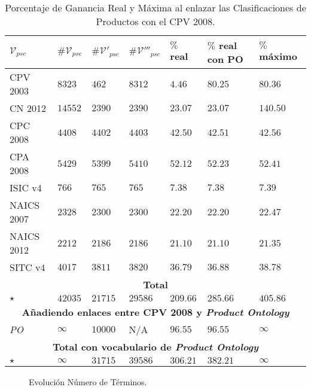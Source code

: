 \documentclass[a4paper,final,11pt,fleqn,twoside]{book}  %
\begin{document}
\begin{table}[!t]
  \centering
  \caption{Porcentaje de Ganancia Real y Máxima al enlazar las Clasificaciones de Productos con el CPV 2008.}\label{ganancia-terminos}   
    \begin{tabular}{|p{1cm}|p{0.9cm}|p{0.9cm}|p{0.9cm}|p{0.9cm}|p{0.9cm}|p{0.75cm}|} 
     \hline
    $\mathcal{V}_{psc}$ & $\#\mathcal{V}_{psc}$  & $\#\mathcal{V'}_{psc}$ &$\#\mathcal{V'''}_{psc}$ &  $\%$ real &  $\%$ real con PO  &  $\%$ máximo   \\\hline
    CPV 2003 	& $8323$  	& $462$		& $8312$ 	& $4.46$ 	& $80.25$	& $80.36$  \\ \hline
    CN 2012  	& $14552$	& $2390$	& $2390$ 	& $23.07$	& $23.07$	& $140.50$  \\ \hline
    CPC 2008 	& $4408$	& $4402$   	& $4403$	& $42.50$	& $42.51$ 	& $42.56$  \\ \hline
    CPA 2008 	& $5429$	& $5399$   	& $5410$	& $52.12$	& $52.23$	& $52.41$  \\ \hline
    ISIC v4  	& $766$		& $765$   	& $765$ 	& $7.38$ 	& $7.38$	& $7.39$    \\ \hline
    NAICS 2007 	& $2328$	& $2300$ 	& $2300$	& $22.20$	& $22.20$	& $22.47$  \\ \hline
    NAICS 2012 	& $2212$	& $2186$ 	& $2186$	& $21.10$	& $21.10$	& $21.35$  \\ \hline
    SITC v4 	& $4017$	& $3811$   	& $3820$	& $36.79$	& $36.88$	& $38.78$  \\ \hline
    \multicolumn{7}{|c|}{\textbf{Total}} \\ \hline
    $\star$ & $42035$ 		& $21715$   	& $29586$	& $209.66$ 	& $285.66$	& $405.86$ \\ \hline
    \hline
    \multicolumn{7}{|c|}{\textbf{Añadiendo enlaces entre CPV 2008 y \textit{Product Ontology}}} \\ \hline
    \textit{PO}& $\infty$	& $10000$   	& N/A	& $96.55$	& $96.55$ 	& $\infty$  \\ \hline
    \multicolumn{7}{|c|}{\textbf{Total con vocabulario de \textit{Product Ontology}}} \\ \hline
    $\star$	 & $\infty$	& $31715$   	& $39586$	& $306.21$	& $382.21$	& $\infty$ \\ \hline
    \hline
  \end{tabular}

\end{table}

\begin{figure}[!htb]
\centering
\caption{Evolución Número de Términos.}
\label{fig:eval-n-terminos}
\end{figure}
\end{document}
